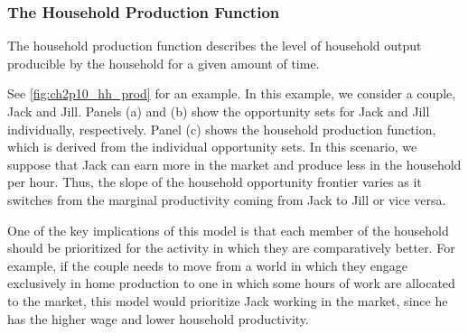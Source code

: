 
\subsubsection{The Household Production Function}

\begin{definition} 
    
    The household production function describes the level of household 
    output producible by the household for a given amount of time.

\end{definition}

See \autoref{fig:ch2p10_hh_prod} for an example.
In this example, we consider a couple, Jack and Jill.
Panels (a) and (b) show the opportunity sets for 
Jack and Jill individually, respectively.
Panel (c) shows the household production function,
which is derived from the individual opportunity sets.
In this scenario, we suppose that Jack can earn more
in the market and produce less in the household 
per hour. Thus, the slope of the household opportunity 
frontier varies as it switches from the marginal 
productivity coming from Jack to Jill or vice versa.

One of the key implications of this model 
is that each member of the household should 
be prioritized for the activity in which they are 
comparatively better. For example, if the couple needs 
to move from a world in which they engage exclusively in 
home production to one in which some hours of work 
are allocated to the market, this model would prioritize 
Jack working in the market, since he has the higher
wage and lower household productivity.


\FloatBarrier

